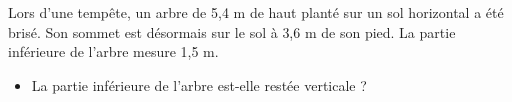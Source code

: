 \documentclass[exercice]{thedocument}%
\begin{document}
%
Lors d'une tempête, un arbre de \textsf{5,4 m} de haut planté sur un sol horizontal a été brisé. Son sommet est désormais sur le sol à \textsf{3,6 m} de son pied. La partie inférieure de l'arbre mesure \textsf{1,5 m}.
\begin{center}
\end{center}
\begin{itemize}
    \item La partie inférieure de l'arbre est-elle restée verticale ?
\end{itemize}
\end{document}
